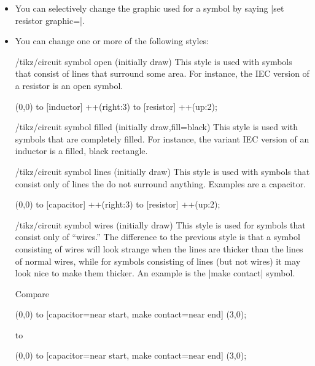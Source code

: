 \begin{itemize}
\begin{codeexample}[]
\end{codeexample}
\item You can selectively change the graphic used for a symbol
  by saying |set resistor graphic=|.
\item You can change one or more of the following styles:
  \begin{stylekey}{/tikz/circuit symbol open (initially draw)}
    This style is used with symbols that consist of lines that
    surround some area. For instance, the IEC version of a resistor is
    an open symbol. 
\begin{codeexample}[]
\tikz [circuit ee IEC,
       circuit symbol open/.style={thick,draw,fill=yellow}]
  \draw (0,0) to [inductor] ++(right:3) to [resistor] ++(up:2);
\end{codeexample}
  \end{stylekey}
  \begin{stylekey}{/tikz/circuit symbol filled (initially {draw,fill=black})}
    This style is used with symbols that are completely filled. For
    instance, the variant IEC version of an inductor is a filled,
    black rectangle. 
  \end{stylekey}
  \begin{stylekey}{/tikz/circuit symbol lines (initially draw)}
    This style is used with symbols that consist only of lines the do
    not surround anything. Examples are a capacitor.
\begin{codeexample}[]
\tikz [circuit ee IEC,
       circuit symbol lines/.style={thick,draw=red}]
  \draw (0,0) to [capacitor] ++(right:3) to [resistor] ++(up:2);
\end{codeexample}
  \end{stylekey}
  \begin{stylekey}{/tikz/circuit symbol wires (initially draw)}
    This style is used for symbols that consist only of ``wires.'' The
    difference to the previous style is that a symbol consisting of
    wires will look strange when the lines are thicker than the lines
    of normal wires, while for symbols consisting of lines (but not
    wires) it may look nice to make them thicker. An example is the
    |make contact| symbol.

    Compare 
\begin{codeexample}[]
\tikz [circuit ee IEC,circuit symbol lines/.style={draw,very thick}]
  \draw (0,0) to [capacitor={near start},
                  make contact={near end}] (3,0);
\end{codeexample}
    to 
\begin{codeexample}[]
\tikz [circuit ee IEC,circuit symbol wires/.style={draw,very thick}]
  \draw (0,0) to [capacitor={near start},
                  make contact={near end}] (3,0);
\end{codeexample}
  \end{stylekey}
\end{itemize}

